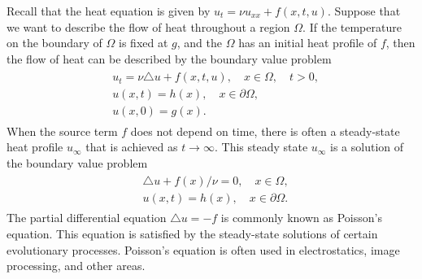 \label{lab:finitedifference2}

% 
% 

Recall that the heat equation is given by $u_t = \nu u_{xx} + f(x,t,u)$. Suppose that we want to describe the flow of heat throughout a region $\Omega$. If the temperature on the boundary of $\Omega$ is fixed at $g$, and the $\Omega$ has an initial heat profile of $f$, then the flow of heat can be described by the boundary value problem 
\begin{align}
	\begin{split}
		& { } u_t = \nu \triangle u + f(x,t,u), \quad x \in \Omega, \quad t >0,\\
		& { }u(x,t) = h(x), \quad x \in \partial \Omega, \\
		& { }u(x,0) = g(x).
	\end{split}
\end{align}
When the source term $f$ does not depend on time, there is often a steady-state heat profile $u_{\infty}$ that is achieved as $t \to \infty$. This steady state $u_{\infty}$ is a solution of the boundary value problem 
\begin{align}
	\begin{split}
		& { }  \triangle u + f(x)/\nu = 0, \quad x \in \Omega,\\
		& { }u(x,t) = h(x), \quad x \in \partial \Omega.
	\end{split}
\end{align}
The partial differential equation $\triangle u = -f$ is commonly known as Poisson's equation. This equation is satisfied by the steady-state solutions of certain evolutionary processes. Poisson's equation is often used in electrostatics, image processing, and other areas. 

